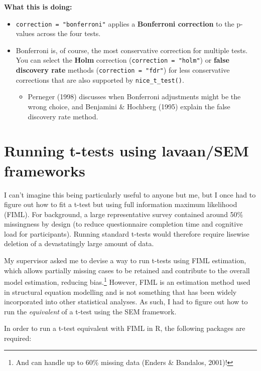 \documentclass[
  letterpaper,
  DIV=11,
  numbers=noendperiod]{scrreprt}
\providecommand{\tightlist}{%
  \setlength{\itemsep}{0pt}\setlength{\parskip}{0pt}}\usepackage{longtable,booktabs,array}
\begin{document}
\textbf{What this is doing:}

\begin{itemize}
\item
  \texttt{correction\ =\ "bonferroni"} applies a \textbf{Bonferroni
  correction} to the p-values across the four tests.
\item
  Bonferroni is, of course, the most conservative correction for
  multiple tests. You can select the \textbf{Holm} correction
  (\texttt{correction\ =\ "holm"}) or \textbf{false discovery rate}
  methods (\texttt{correction\ =\ "fdr"}) for less conservative
  corrections that are also supported by \texttt{nice\_t\_test()}.

  \begin{itemize}
  \tightlist
  \item
    Perneger (1998) discusses when Bonferroni adjustments might be the
    wrong choice, and Benjamini \& Hochberg (1995) explain the false
    discovery rate method.
  \end{itemize}
\end{itemize}

\section{Running t-tests using lavaan/SEM
frameworks}\label{running-t-tests-using-lavaansem-frameworks}

I can't imagine this being particularly useful to anyone but me, but I
once had to figure out how to fit a t-test but using full information
maximum likelihood (FIML). For background, a large representative survey
contained around 50\% missingness by design (to reduce questionnaire
completion time and cognitive load for participants). Running standard
t-tests would therefore require lisewise deletion of a devastatingly
large amount of data.

My supervisor asked me to devise a way to run t-tests using FIML
estimation, which allows partially missing cases to be retained and
contribute to the overall model estimation, reducing bias.\footnote{And
  can handle up to 60\% missing data (Enders \& Bandalos, 2001)!}
However, FIML is an estimation method used in structural equation
modelling and is not something that has been widely incorporated into
other statistical analyses. As such, I had to figure out how to run the
\emph{equivalent} of a t-test using the SEM framework.

In order to run a t-test equivalent with FIML in R, the following
packages are required:
\end{document}
